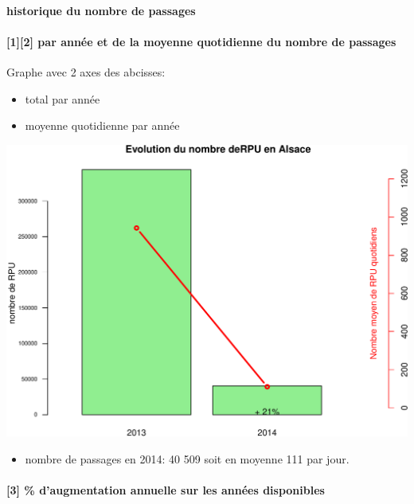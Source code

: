 \documentclass[]{article}
\begin{document}
\paragraph{historique du nombre de
passages}\label{historique-du-nombre-de-passages}

\paragraph{{[}1{]}{[}2{]} par année et de la moyenne quotidienne du
nombre de
passages}\label{par-annee-et-de-la-moyenne-quotidienne-du-nombre-de-passages}

Graphe avec 2 axes des abcisses:

\begin{itemize}
\itemsep1pt\parskip0pt
\item
  total par année
\item
  moyenne quotidienne par année
\end{itemize}

\includegraphics{rapport_2014_files/figure-latex/c1-1.pdf}

\begin{itemize}
\itemsep1pt\parskip0pt
\item
  nombre de passages en 2014: 40 509 soit en moyenne 111 par jour.
\end{itemize}

\paragraph{{[}3{]} \% d'augmentation annuelle sur les années
disponibles}\label{daugmentation-annuelle-sur-les-annees-disponibles}
\end{document}
